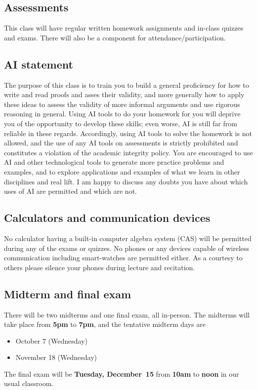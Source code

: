 \documentclass[12pt]{amsart}
\begin{document}
\subsection*{Assessments}
This class will have regular written homework assignments and in-class quizzes and exams. There will also be a component for attendance/participation.

\subsection*{AI statement} 
 The purpose of this class is to train you to build a general proficiency for how to write and read proofs and asses their validity, and more generally how to apply these ideas to assess the validity of more informal arguments and use rigorous reasoning in general. Using AI tools to do your homework for you will deprive you of the opportunity to develop these skills; even worse, AI is still far from reliable in these regards.
 Accordingly, using AI tools to solve the homework is {not} allowed, and the use of any AI tools on assessments is strictly prohibited and constitutes a violation of the academic integrity policy. You are encouraged to use AI and other technological tools to generate more practice problems and examples, and to explore applications and examples of what we learn in other disciplines and real lift. I am happy to discuss any doubts you have about which uses of AI are permitted and which are not. 

\subsection*{Calculators and communication devices} No calculator having a built-in computer algebra system (CAS) will be permitted during any of the exams or quizzes. No phones or any devices capable of wireless communication including smart-watches are permitted either. As a courtesy to others please silence your phones during lecture and recitation.

\subsection*{Midterm and final exam} There will be two {midterms} and one {final exam}, all in-person. The midterms will take place from \textbf{5pm} to \textbf{7pm}, and the tentative midterm days are 
\begin{itemize}
\item October 7 (Wednesday)
\item November 18 (Wednesday)
\end{itemize}
The final exam will be 
{\bf Tuesday, December~15} from \textbf{10am} to \textbf{noon} in our usual classroom.
\end{document}
